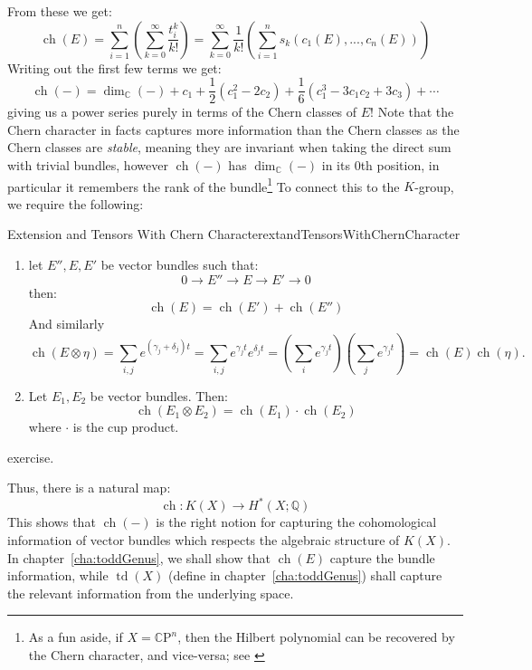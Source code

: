 \documentclass{ut-thesis}
\newenvironment{Proof}[1][]
  {\begin{ProofTcb}[#1]}
  {\end{ProofTcb}}
\newcommand{\Q}{{\mathbb{Q}}}
\newcommand{\C}{{\mathbb{C}}}
\newcommand{\CP}{{\mathbb{C}\mathrm{P}}}
\newcommand{\ch}{{\operatorname{ch}}}
\newcommand{\td}{{\operatorname{td}}}
\renewcommand{\ch}{{\operatorname{ch}}}
\begin{document}
From these we get:
\[
\ch(E) = \sum_{i=1}^n \left(\sum_{k=0}^{\infty} \frac{t_i^k}{k!}\right) = \sum_{k=0}^{\infty}
\frac{1}{k!}\left(\sum_{i=1}^n s_k(c_1(E), ..., c_n(E))\right)
\]
Writing out the first few terms we get:
\[
  \ch(-) = \dim_\C(-) + c_1 + \frac{1}{2}(c_1^2 - 2c_2) + \frac{1}{6}(c_1^3 - 3c_1c_2 + 3c_3) + \cdots
\]
giving us a power series purely in terms of the Chern classes of $E$! Note that the Chern character in facts
captures more information than the Chern classes as the Chern classes are \emph{stable}, meaning they are
invariant when taking the direct sum with trivial bundles, however $\ch(-)$ has $\dim_\C(-)$ in its $0$th
position, in particular it remembers the rank of the bundle\footnote{As a fun aside, if $X = \CP^n$, then the
Hilbert polynomial can be recovered by the Chern character, and vice-versa; see \cite{chanCorresondenceHilbertPolynomial2004}} To connect this to the $K$-group, we
require the following:

\begin{prop}{Extension and Tensors With Chern Character}{extandTensorsWithChernCharacter}
  \begin{enumerate}
    \item let $E'', E, E'$ be vector bundles such that:
  \[
    0 \to E'' \to E \to E' \to 0
  \]
  then:
  \[
    \ch(E) = \ch(E') + \ch(E'')
  \]
  And similarly
  \[
      \operatorname{ch}(E \otimes \eta) = \sum_{i,j} e^{(\gamma_j+\delta_j)t} = \sum_{i,j} e^{\gamma_j t}e^{\delta_j t} = \left(\sum_i e^{\gamma_j t}\right)\left(\sum_j e^{\gamma_j t}\right) = \operatorname{ch}(E)\operatorname{ch}(\eta).
  \]
    \item Let $E_1, E_2$ be vector bundles. Then:
      \[
        \ch(E_1\otimes E_2) = \ch(E_1)\cdot \ch(E_2)
    \]
    where $\cdot$ is the cup product.
  \end{enumerate}
\end{prop}

\begin{Proof}
  exercise.
\end{Proof}

 Thus, there is a natural map:
\[
  \ch: K(X) \to H^*(X; \Q)
\]
This shows that $\ch(-)$ is the right notion for capturing the cohomological information of vector bundles which
respects the algebraic structure of $K(X)$. In chapter~\ref{cha:toddGenus}, we shall show that $\ch(E)$
capture the bundle information, while $\td(X)$ (define in chapter~\ref{cha:toddGenus}) shall capture the
relevant information from the underlying space.
\end{document}
